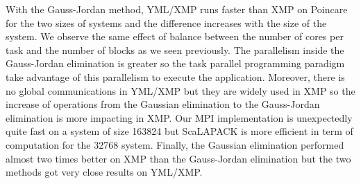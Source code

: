 With the Gauss-Jordan method, YML/XMP runs faster than XMP on Poincare for the two sizes of systems and the difference increases with the size of the system.
We observe the same effect of balance between the number of cores per task and the number of blocks as we seen previously.
The parallelism inside the Gauss-Jordan elimination is greater so the task parallel programming paradigm take advantage of this parallelism to execute the application.
Moreover, there is no global communications in YML/XMP but they are widely used in XMP so the increase of operations from the Gaussian elimination to the Gauss-Jordan elimination is more impacting in XMP.
Our MPI implementation is unexpectedly quite fast on a system of size 163824 but ScaLAPACK is more efficient in term of computation for the 32768 system.
Finally, the Gaussian elimination performed almost two times better on XMP than the Gauss-Jordan elimination but the two methods got very close results on YML/XMP.

